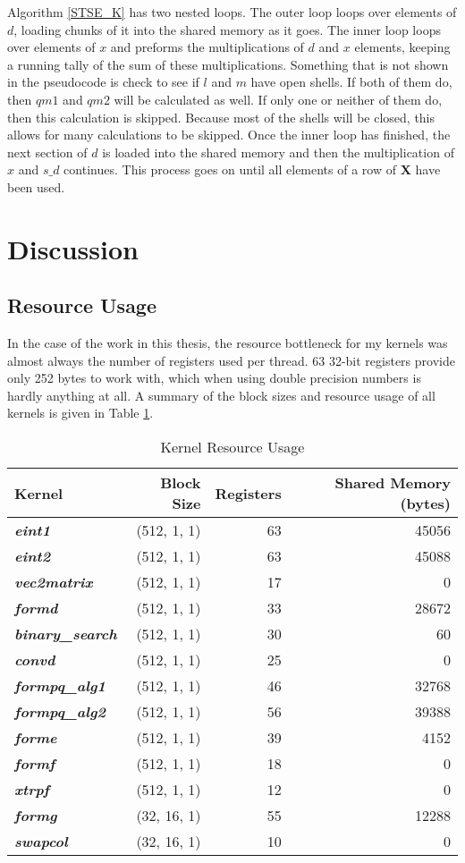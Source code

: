 \documentclass[12pt]{report}
\newcommand{\kernel}[1]{\textit{\textbf{#1}}}
\begin{document}
Algorithm \ref{STSE_K} has two nested loops. The outer loop loops over elements of $d$, loading chunks of it into the shared memory as it goes. The inner loop loops over elements of $x$ and preforms the multiplications of $d$ and $x$ elements, keeping a running tally of the sum of these multiplications. Something that is not shown in the pseudocode is check to see if $l$ and $m$ have open shells. If both of them do, then $qm1$ and $qm2$ will be calculated as well. If only one or neither of them do, then this calculation is skipped. Because most of the shells will be closed, this allows for many calculations to be skipped. Once the inner loop has finished, the next section of $d$ is loaded into the shared memory and then the multiplication of $x$ and $s\_d$ continues. This process goes on until all elements of a row of \textbf{X} have been used.

\section{Discussion}
\subsection{Resource Usage}
In the case of the work in this thesis, the resource bottleneck for my kernels was almost always the number of registers used per thread. 63 32-bit registers provide only 252 bytes to work with, which when using double precision numbers is hardly anything at all. A summary of the block sizes and resource usage of all kernels is given in Table \ref{tab:resources}.

\begin{table}[h]
\caption{Kernel Resource Usage}
\label{tab:resources}
\begin{tabular}{lrrr}
	Kernel				&	Block Size		&	Registers	&	Shared Memory (bytes)	\\
	\hline
	\kernel{eint1}			&	(512, 1, 1)		&	63		&	45056				\\
	\kernel{eint2}			&	(512, 1, 1)		&	63		&	45088				\\
	\kernel{vec2matrix}		&	(512, 1, 1)		&	17		&	0					\\
	\kernel{formd}			&	(512, 1, 1)		&	33		&	28672				\\
	\kernel{binary\_search}	&	(512, 1, 1)		&	30		&	60					\\
	\kernel{convd}			&	(512, 1, 1)		&	25		&	0					\\
	\kernel{formpq\_alg1}	&	(512, 1, 1)		&	46		&	32768				\\
	\kernel{formpq\_alg2}	&	(512, 1, 1)		&	56		&	39388				\\
	\kernel{forme}			&	(512, 1, 1)		&	39		&	4152					\\
	\kernel{formf}			&	(512, 1, 1)		&	18		&	0					\\
	\kernel{xtrpf}			&	(512, 1, 1)		&	12		&	0					\\
	\kernel{formg}			&	(32, 16, 1)		&	55		&	12288				\\
	\kernel{swapcol}		&	(32, 16, 1)		&	10		&	0					\\
\end{tabular}
\end{table}
\end{document}
